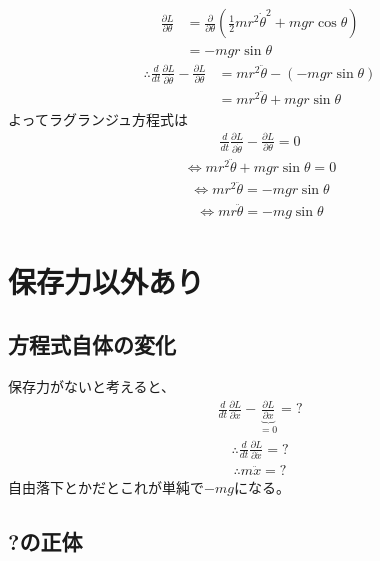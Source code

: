 \documentclass[a4paper,11pt]{jsarticle}
\begin{document}
\begin{align*}
  \frac{\partial L}{\partial \theta}
  &= \frac{\partial }{\partial \theta}\left(\frac{1}{2}mr^2\dot{\theta}^2 + mgr\cos\theta\right)
  \\ &= - mgr\sin\theta
\end{align*}
\begin{align*}
  \therefore \frac{d}{dt}\frac{\partial L}{\partial \dot{\theta}} - \frac{\partial L}{\partial \theta}
  &= mr^2\ddot{\theta} - \left(-mgr\sin\theta\right)
  \\ &= mr^2\ddot{\theta} + mgr\sin\theta
\end{align*}
よってラグランジュ方程式は
\begin{align*}
  \frac{d}{dt}\frac{\partial L}{\partial \dot{\theta}} - \frac{\partial L}{\partial \theta} = 0
\end{align*}
\begin{align*}
  \Leftrightarrow mr^2\ddot{\theta} + mgr\sin\theta = 0
\end{align*}
\begin{align*}
  \Leftrightarrow mr^2\ddot{\theta} = -mgr\sin\theta
\end{align*}
\begin{align*}
  \Leftrightarrow mr\ddot{\theta} = -mg\sin\theta
\end{align*}

\section{保存力以外あり}

\subsection{方程式自体の変化}

保存力がないと考えると、
\begin{align*}
  \frac{d}{dt}\frac{\partial L}{\partial \dot{x}} - \underbrace{\frac{\partial L}{\partial x}}_{=0} = ?
\end{align*}
\begin{align*}
  \therefore\frac{d}{dt}\frac{\partial L}{\partial \dot{x}} = ?
\end{align*}
\begin{align*}
  \therefore m\ddot{x} = ?
\end{align*}
自由落下とかだとこれが単純で$-mg$になる。

\subsection{?の正体}
\end{document}
